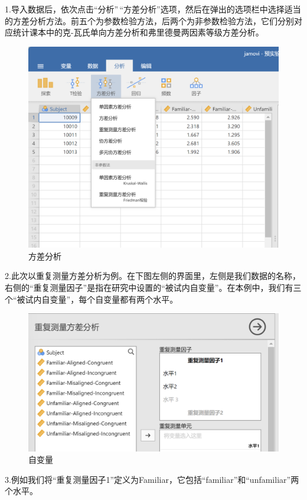 \documentclass[]{ctexbook}
\theoremstyle{definition}
\theoremstyle{definition}
\theoremstyle{definition}
\theoremstyle{definition}
\theoremstyle{remark}
\begin{document}
1.导入数据后，依次点击``分析''\,``方差分析''选项，然后在弹出的选项栏中选择适当的方差分析方法。前五个为参数检验方法，后两个为非参数检验方法，它们分别对应统计课本中的克-瓦氏单向方差分析和弗里德曼两因素等级方差分析。

\begin{figure}

{\centering \includegraphics[width=0.8\linewidth]{img/jamovi/anova} 

}

\caption{方差分析}\label{fig:jamovi-anova}
\end{figure}

2.此次以重复测量方差分析为例。在下图左侧的界面里，左侧是我们数据的名称，右侧的``重复测量因子''是指在研究中设置的``被试内自变量''。在本例中，我们有三个``被试内自变量''，每个自变量都有两个水平。

\begin{figure}

{\centering \includegraphics[width=0.6\linewidth]{img/jamovi/rmanova-factor} 

}

\caption{自变量}\label{fig:jamovi-rmanova-factor}
\end{figure}

3.例如我们将``重复测量因子1''定义为Familiar，它包括``familiar''和``unfamiliar''两个水平。
\end{document}

